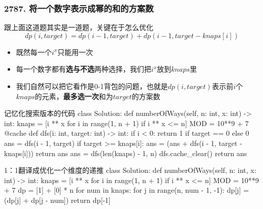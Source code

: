 \begin{frame}[fragile]          %
  \frametitle{\textsc{2787. 将一个数字表示成幂的和的方案数}}
  \begin{alertblock}{跟上面这道题其实是一道题，关键在于怎么优化}
    \begin{equation*}
      dp(i,target)=dp(i-1,target)+dp(i-1,target-knaps[i])
    \end{equation*}
  \end{alertblock}
  \begin{itemize}
    \item 既然每一个$i^x$只能用一次
    \item 每一个数字都有\textbf{选与不选}两种选择，我们把$i^x$放到$knaps$里
    \item 我们自然可以把它看作是0-1背包的问题，也就是$dp(i,target)$表示前$i$个$knaps$的元素，\textbf{最多选一次}和为$target$的方案数
  \end{itemize}
\end{frame}

\begin{frame}[fragile]          %
  
  \begin{codeblock}[language=python]{记忆化搜索版本的代码}
class Solution:
    def numberOfWays(self, n: int, x: int) -> int:
        knaps = [i ** x for i in range(1, n + 1) if i ** x <= n]
        MOD = 10**9 + 7
        @cache
        def dfs(i: int, target: int) -> int:
            if i < 0:
                return 1 if target == 0 else 0
            ans = dfs(i - 1, target)
            if target >= knaps[i]:
                ans = (ans + dfs(i - 1, target - knaps[i])) %
            return ans
        ans = dfs(len(knaps) - 1, n)
        dfs.cache_clear()
        return ans
  \end{codeblock}
\end{frame}

\begin{frame}[fragile]
  \begin{codeblock}[language=python]{1：1翻译成优化一个维度的递推}
class Solution:
    def numberOfWays(self, n: int, x: int) -> int:
        knaps = [i ** x for i in range(1, n + 1) if i ** x <= n]
        MOD = 10**9 + 7
        dp = [1] + [0] * n
        for num in knaps:
            for j in range(n, num - 1, -1):
                dp[j] = (dp[j] + dp[j - num]) %
        return dp[-1]
  \end{codeblock}
\end{frame}


